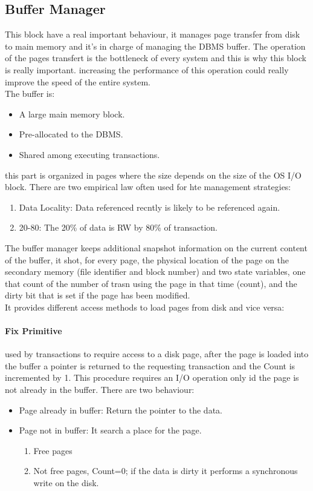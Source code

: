 \documentclass[12pt]{article}
\begin{document}
\subsection{Buffer Manager}
This block have a real important behaviour, it manages page transfer from disk to main memory and it's in charge of managing the DBMS buffer. The operation of the pages transfert is the bottleneck of every system and this is why this block is really important. increasing the performance of this operation could really improve the speed of the entire system.\\
The buffer is:
\begin{itemize}
  \item A large main memory block.
  \item Pre-allocated to the DBMS.
  \item Shared among executing transactions.
\end{itemize}
this part is organized in pages where the size depends on the size of the OS I/O block. There are two empirical law often used for hte management strategies:
\begin{enumerate}
  \item Data Locality: Data referenced recntly is likely to be referenced again.
  \item 20-80: The 20\% of data is RW by 80\% of transaction.
\end{enumerate}
The buffer manager keeps additional snapshot information on the current content of the buffer, it shot, for every page, the physical location of the page on the secondary memory (file identifier and block number) and two state variables, one that count of the number of trasn using the page in that time (count), and the dirty bit that is set if the page has been modified.\\ %
It provides different access methods to load pages from disk and vice versa:
\paragraph{Fix Primitive} used by transactions to require access to a disk page, after the page is loaded into the buffer a pointer is returned to the requesting transaction and the Count is incremented by 1. This procedure requires an I/O operation only id the page is not already in the buffer. There are two behaviour:
\begin{itemize}
  \item Page already in buffer: Return the pointer to the data.
  \item Page not in buffer: It search a place for the page.
  \begin{enumerate}
    \item Free pages
    \item Not free pages, Count=0; if the data is dirty it performs a synchronous write on the disk.
  \end{enumerate}
\end{itemize}
\end{document}
